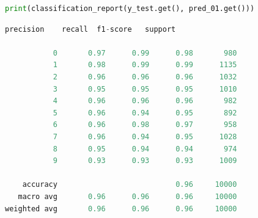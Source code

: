 \documentclass[a4paper,12pt]{article}
\begin{document}
\begin{lstlisting}[language=Python]
print(classification_report(y_test.get(), pred_01.get()))
\end{lstlisting}

\begin{lstlisting}[language=Python]
              precision    recall  f1-score   support

           0       0.97      0.99      0.98       980
           1       0.98      0.99      0.99      1135
           2       0.96      0.96      0.96      1032
           3       0.95      0.95      0.95      1010
           4       0.96      0.96      0.96       982
           5       0.96      0.94      0.95       892
           6       0.96      0.98      0.97       958
           7       0.96      0.94      0.95      1028
           8       0.95      0.94      0.94       974
           9       0.93      0.93      0.93      1009

    accuracy                           0.96     10000
   macro avg       0.96      0.96      0.96     10000
weighted avg       0.96      0.96      0.96     10000

\end{lstlisting}
\end{document}
